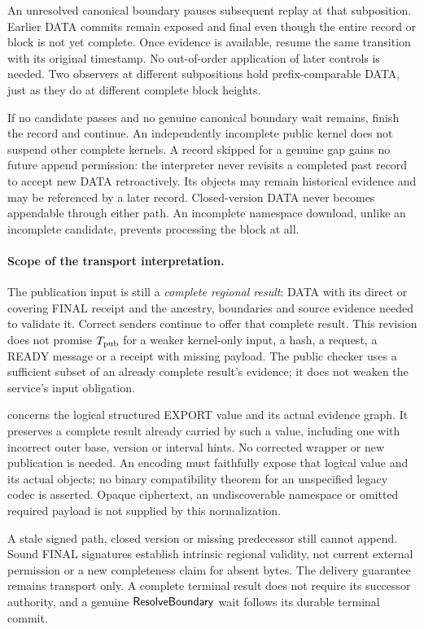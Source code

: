 An unresolved canonical boundary pauses subsequent replay at that
subposition. Earlier DATA commits remain exposed and final even though
the entire record or block is not yet complete. Once evidence is
available, resume the same transition with its original timestamp.
No out-of-order application of later controls is needed. Two observers
at different subpositions hold prefix-comparable DATA, just as they do
at different complete block heights.

If no candidate passes and no genuine canonical boundary wait remains,
finish the record and continue. An independently incomplete public kernel
does not suspend other complete kernels. A record skipped for a genuine
gap gains no future append permission: the interpreter never revisits
a completed past record to accept new DATA retroactively. Its objects
may remain historical evidence and may be referenced by a later record.
Closed-version DATA never becomes appendable through either path.
An incomplete namespace download, unlike an incomplete candidate,
prevents processing the block at all.

\paragraph{Scope of the transport interpretation.}
\label{sec:transport-scope}
The publication input is still a \emph{complete regional result}:
DATA with its direct or covering FINAL receipt and the ancestry,
boundaries and source evidence needed to validate it. Correct senders
continue to offer that complete result. This revision does not promise
$T_{\rm pub}$ for a weaker kernel-only input, a hash, a request, a READY
message or a receipt with missing payload. The public checker uses a
sufficient subset of an already complete result's evidence; it does not
weaken the service's input obligation.

 concerns the logical structured EXPORT
value and its actual evidence graph. It preserves a complete result
already carried by such a value, including one with incorrect outer
base, version or interval hints. No corrected wrapper or new publication
is needed. An encoding must faithfully expose that logical value and
its actual objects; no binary compatibility theorem for an unspecified
legacy codec is asserted. Opaque ciphertext, an undiscoverable namespace
or omitted required payload is not supplied by this normalization.

A stale signed path, closed version or missing predecessor still cannot
append. Sound FINAL signatures establish intrinsic regional validity,
not current external permission or a new completeness claim for absent
bytes. The delivery guarantee remains transport only. A complete
terminal result does not require its successor authority, and a genuine
$\mathsf{ResolveBoundary}$ wait follows its durable terminal commit.

